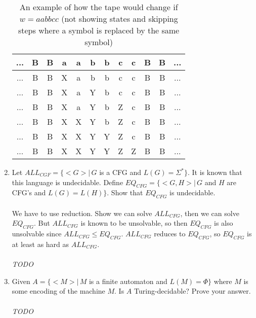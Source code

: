 \documentclass[10pt,a4paper,final]{article}
\begin{document}
\begin{enumerate}
\begin{table}[h!]
\begin{center}
\begin{tabular}{|c|c|c|c|c|c|c|c|c|c|c|c|}
\hline
... & B & B & a & a & b & b & c & c & B & B & ... \\
\hline
... & B & B & X & a & b & b & c & c & B & B & ... \\
\hline
... & B & B & X & a & Y & b & c & c & B & B & ... \\
\hline
... & B & B & X & a & Y & b & Z & c & B & B & ... \\
\hline
... & B & B & X & X & Y & b & Z & c & B & B & ... \\
\hline
... & B & B & X & X & Y & Y & Z & c & B & B & ... \\
\hline
... & B & B & X & X & Y & Y & Z & Z & B & B & ... \\
\hline
\end{tabular}
\end{center}
\caption{An example of how the tape would change if $w = aabbcc$ (not showing states and skipping steps
where a symbol is replaced by the same symbol)}
\end{table}

\item %
Let $ALL_{CGF} = \{<G> |\, G$ is a CFG and $L(G) = \Sigma^*\}$.
It is known that this language is undecidable.
Define $EQ_{CFG} = \{<G,H> |\, G$ and $H$ are CFG's and $L(G) = L(H)\}$.
Show that $EQ_{CFG}$ is undecidable. \\
\\
We have to use reduction. Show we can solve $ALL_{CFG}$, then we can solve $EQ_{CFG}$.
But $ALL_{CFG}$ is known to be unsolvable, so then $EQ_{CFG}$ is also unsolvable since
$ALL_{CFG} \leq EQ_{CFG}$. $ALL_{CFG}$ reduces to $EQ_{CFG}$, so $EQ_{CFG}$ is at least as hard
as $ALL_{CFG}$. \\
\\
\emph{TODO}

\item %
Given $A = \{<M> |\, M$ is a finite automaton and $L(M) = \Phi\}$
where $M$ is some encoding of the machine $M$. Is $A$ Turing-decidable? Prove your answer. \\
\\
\emph{TODO}


\end{enumerate}
\end{document}
